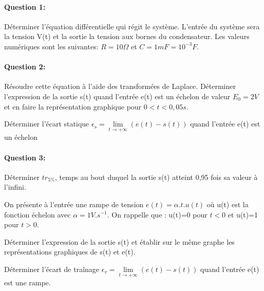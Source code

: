 \paragraph{Question 1:}

Déterminer l'équation différentielle qui régit le système. L'entrée du système sera la tension V(t) et la sortie la tension aux bornes du condensateur. Les valeurs numériques sont les suivantes: $R=10\Omega$ et $C=1mF=10^{-3}F$.

\paragraph{Question 2:}

Résoudre cette équation à l'aide des transformées de Laplace. Déterminer l'expression de la sortie s(t) quand l'entrée e(t) est un échelon de valeur $E_0=2V$ et en faire la représentation graphique pour $0<t<0,05s$.

Déterminer l'écart statique $\epsilon_s=\lim\limits_{t \to +\infty}(e(t)-s(t))$ quand l'entrée e(t) est un échelon

\paragraph{Question 3:}

Déterminer $tr_{5\%}$, temps au bout duquel la sortie s(t) atteint 0,95 fois sa valeur à l'infini.

On présente à l'entrée une rampe de tension $e(t)=\alpha.t.u(t)$ où u(t) est la fonction échelon avec $\alpha=1V.s^{-1}$. On rappelle que : u(t)=0 pour $t<0$ et u(t)=1 pour $t>0$.

Déterminer l'expression de la sortie s(t) et établir sur le même graphe les représentations graphiques de s(t) et e(t).

Déterminer l'écart de traînage $\epsilon_v=\lim\limits_{t \to +\infty}(e(t)-s(t))$ quand l'entrée e(t) est une rampe.

